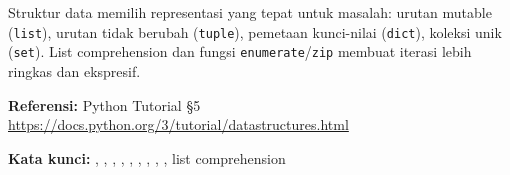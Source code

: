 \documentclass[../main.tex]{subfiles}
\begin{document}
\begin{rangkuman}
Struktur data memilih representasi yang tepat untuk masalah: urutan mutable (\texttt{list}), urutan tidak berubah (\texttt{tuple}), pemetaan kunci-nilai (\texttt{dict}), koleksi unik (\texttt{set}). List comprehension dan fungsi \texttt{enumerate}/\texttt{zip} membuat iterasi lebih ringkas dan ekspresif.

\textbf{Referensi:} {\small Python Tutorial §5 \url{https://docs.python.org/3/tutorial/datastructures.html}}

\textbf{Kata kunci:} , , , , , , , , , list comprehension
\end{rangkuman}
\end{document}
